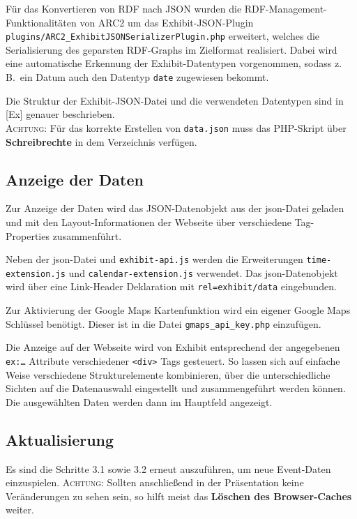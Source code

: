 \documentclass[11pt,a4paper]{article}
\begin{document}
Für das Konvertieren von RDF nach JSON wurden die RDF-Management-Funktionalitäten von ARC2 um das
Exhibit-JSON-Plug\-in \texttt{plugins/ARC2\_ExhibitJSONSerializerPlugin.php}
erweitert, welches die Serialisierung des geparsten RDF-Graphs im Zielformat
realisiert.  Dabei wird eine automatische Erkennung der Exhibit-Datentypen
vorgenommen, sodass z.\,B.\ ein Datum auch den Datentyp \texttt{date}
zugewiesen bekommt.

Die Struktur der Exhibit-JSON-Datei und die verwendeten Datentypen sind in
[Ex] genauer beschrieben.\\
{\Large\textsc{Achtung:} Für das korrekte Erstellen von \texttt{data.json} muss das PHP-Skript über \textbf{Schreibrechte} in dem Verzeichnis verfügen.} 

\subsection{Anzeige der Daten}

Zur Anzeige der Daten wird das JSON-Datenobjekt aus der json-Datei geladen und
mit den Layout-Informationen der Webseite über verschiedene Tag-Properties
zusammenführt.

Neben der json-Datei und \texttt{exhibit-api.js} werden die Erweiterungen
\texttt{time-extension.js} und \texttt{calendar-extension.js} verwendet.
Das json-Datenobjekt wird über eine Link-Header Deklaration mit
\texttt{rel={\dq}exhibit/data{\dq}} eingebunden. 

Zur Aktivierung der Google Maps Kartenfunktion wird ein eigener Google Maps
Schlüssel benötigt. Dieser ist in die Datei \texttt{gmaps\_api\_key.php} einzufügen.

Die Anzeige auf der Webseite wird von Exhibit entsprechend der angegebenen
\texttt{ex:\ldots} Attribute verschiedener \texttt{<div>} Tags gesteuert.  So
lassen sich auf einfache Weise verschiedene Strukturelemente kombinieren, über
die unterschiedliche Sichten auf die Datenauswahl eingestellt und
zusammengeführt werden können.  Die ausgewählten Daten werden dann im
Hauptfeld angezeigt. 

\subsection{Aktualisierung}
Es sind die Schritte 3.1 sowie 3.2 erneut auszuführen, um neue Event-Daten einzuspielen. {\Large\textsc{Achtung:} Sollten anschließend in der Präsentation keine Veränderungen zu sehen sein, so hilft meist das \textbf{Löschen des Browser-Caches} weiter.}
\end{document}
